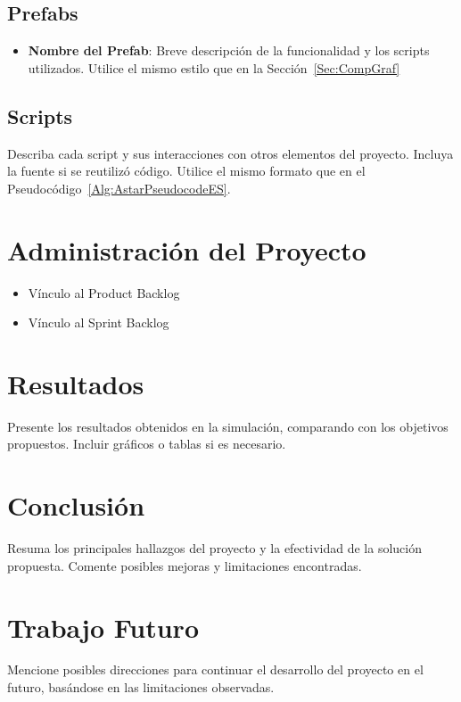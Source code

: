 \documentclass[sjournal]{IEEEtran}
\begin{document}
\subsection{Prefabs}
\begin{itemize}
    \item \textbf{Nombre del Prefab}: Breve descripción de la funcionalidad y los scripts utilizados. Utilice el mismo estilo que en la Sección~\ref{Sec:CompGraf}
\end{itemize}

\subsection{Scripts}
Describa cada script y sus interacciones con otros elementos del proyecto. Incluya la fuente si se reutilizó código. Utilice el mismo formato que en el Pseudocódigo~\ref{Alg:AstarPseudocodeES}.

\section{Administración del Proyecto}
\begin{itemize}
    \item Vínculo al Product Backlog
    \item Vínculo al Sprint Backlog
\end{itemize}

\section{Resultados}
Presente los resultados obtenidos en la simulación, comparando con los objetivos propuestos. Incluir gráficos o tablas si es necesario.

\section{Conclusión}
Resuma los principales hallazgos del proyecto y la efectividad de la solución propuesta. Comente posibles mejoras y limitaciones encontradas.

\section{Trabajo Futuro}
Mencione posibles direcciones para continuar el desarrollo del proyecto en el futuro, basándose en las limitaciones observadas.




\end{document}
